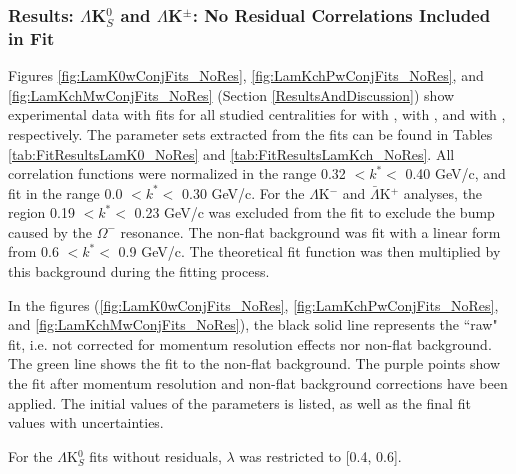 \documentclass[../AnalysisNoteJBuxton.tex]{subfiles}
\begin{document}
\subsubsection{Results: \texorpdfstring{$\Lambda$K$^{0}_{S}$ and $\Lambda$K$^{\pm}$: No Residual Correlations Included in Fit}{TEXT}}
\label{ResultsLamK_NoRes}

Figures \ref{fig:LamK0wConjFits_NoRes}, \ref{fig:LamKchPwConjFits_NoRes}, and \ref{fig:LamKchMwConjFits_NoRes} (Section \ref{ResultsAndDiscussion}) show experimental data with fits for all studied centralities for \LamKs with \ALamKs, \LamKchP with \ALamKchM, and \LamKchM with \ALamKchP, respectively.
The parameter sets extracted from the fits can be found in Tables \ref{tab:FitResultsLamK0_NoRes} and \ref{tab:FitResultsLamKch_NoRes}.
All correlation functions were normalized in the range 0.32 $< k^{*} <$ 0.40 GeV/c, and fit in the range 0.0 $< k^{*} <$ 0.30 GeV/c.
For the $\Lambda$K$^{-}$ and $\bar{\Lambda}$K$^{+}$ analyses, the region 0.19 $< k^{*} <$ 0.23 GeV/c was excluded from the fit to exclude the bump caused by the $\Omega^{-}$ resonance.
The non-flat background was fit with a linear form from 0.6 $< k^{*} <$ 0.9 GeV/c.
The theoretical fit function was then multiplied by this background during the fitting process.

In the figures (\ref{fig:LamK0wConjFits_NoRes}, \ref{fig:LamKchPwConjFits_NoRes}, and \ref{fig:LamKchMwConjFits_NoRes}), the black solid line represents the ``raw" fit, i.e. not corrected for momentum resolution effects nor non-flat background.
The green line shows the fit to the non-flat background.  The purple points show the fit after momentum resolution and non-flat background corrections have been applied.
The initial values of the parameters is listed, as well as the final fit values with uncertainties.

For the $\Lambda$K$^{0}_{S}$ fits without residuals, $\lambda$ was restricted to [0.4, 0.6].
\end{document}
